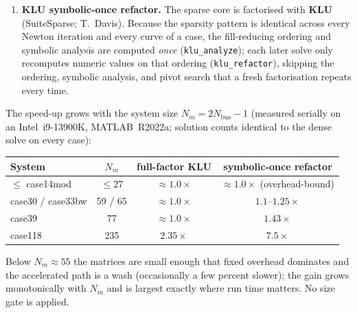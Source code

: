 \documentclass[11pt,a4paper]{article}
\newcommand{\code}[1]{\texttt{#1}}
\begin{document}
\begin{enumerate}[leftmargin=1.6em]
        $m\times m$ dense solve, and the dense $(N_m{+}m)\times(N_m{+}m)$ matrix $J_1$ is
        never assembled.
  \item \textbf{KLU symbolic-once refactor.} The sparse core is factorised with \textbf{KLU}
        (SuiteSparse; T.~Davis). Because the sparsity pattern is identical across every
        Newton iteration and every curve of a case, the fill-reducing ordering and symbolic
        analysis are computed \emph{once} (\code{klu_analyze}); each later solve only
        recomputes numeric values on that ordering (\code{klu_refactor}), skipping the
        ordering, symbolic analysis, and pivot search that a fresh factorisation repeats
        every time.
\end{enumerate}

The speed-up grows with the system size $N_m=2N_{\text{bus}}-1$ (measured serially on an
Intel~i9-13900K, MATLAB~R2022a; solution counts identical to the dense solve on every case):
\begin{center}
\begin{tabular}{@{}lccc@{}}
\toprule
System & $N_m$ & full-factor KLU & symbolic-once refactor\\
\midrule
$\le$ case14mod   & $\le 27$ & ${\approx}1.0\times$ & ${\approx}1.0\times$ (overhead-bound)\\
case30 / case33bw & 59 / 65  & ${\approx}1.0\times$ & $1.1$--$1.25\times$\\
case39            & 77       & ${\approx}1.0\times$ & $1.43\times$\\
case118           & 235      & $2.35\times$         & $\mathbf{7.5\times}$\\
\bottomrule
\end{tabular}
\end{center}
Below $N_m\approx 55$ the matrices are small enough that fixed overhead dominates and the
accelerated path is a wash (occasionally a few percent slower); the gain grows monotonically
with $N_m$ and is largest exactly where run time matters. No size gate is applied.
\end{document}
